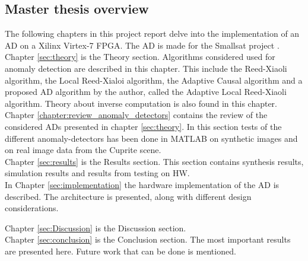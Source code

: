 \newpage
\subsection{Master thesis overview}
The following chapters in this project report delve into the implementation of an AD on a Xilinx Virtex-7 FPGA. The AD is made for the Smallsat project \cite{SmallSat_project_description}. \\  

Chapter \ref{sec:theory} is the Theory section.  Algorithms considered used for anomaly detection are described in this chapter. This include the Reed-Xiaoli algorithm, the Local Reed-Xialoi algorithm, the Adaptive Causal algorithm and a proposed AD algorithm by the author, called the Adaptive Local Reed-Xiaoli algorithm. Theory about inverse computation is also found in this chapter.   \\


Chapter \ref{chapter:review_anomaly_detectors} contains the review of the considered ADs presented in chapter \ref{sec:theory}. In this section tests of the different anomaly-detectors has been done in MATLAB on synthetic images and on real image data from the Cuprite scene.\\  


Chapter \ref{sec:results} is the Results section. This section contains synthesis results, simulation results and results from testing on HW.
\\

In Chapter \ref{sec:implementation} the hardware implementation of the AD is described. The architecture is presented, along with different design considerations. 

Chapter \ref{sec:Discussion} is the Discussion section. 
\\

Chapter \ref{sec:conclusion} is the Conclusion section. The most important results are presented here.  Future work that can be done is mentioned.
\\




